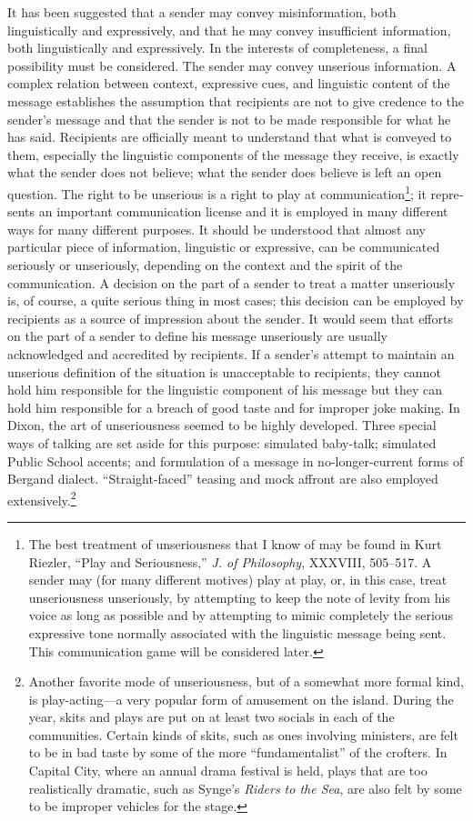 \documentclass[twoside,symmetric,nobib,justified]{tufte-book}
\begin{document}
It has been suggested that a sender may convey misin­formation, both
linguistically and expressively, and that he may convey insufficient
information, both linguistically and expres­sively. In the interests of
completeness, a final possibility must be considered. The sender may
convey unserious information. A complex relation between context,
expressive cues, and linguis­tic content of the message establishes the
assumption that recipi­ents are not to give credence to the sender's
message and that the sender is not to be made responsible for what he
has said. Recipients are officially meant to understand that what is
con­veyed to them, especially the linguistic components of the mes­sage
they receive, is exactly what the sender does not believe; what the
sender does believe is left an open question. The right to be unserious
is a right to play at communication\footnote{The best treatment of
  unseriousness that I know of may be found in Kurt Riezler, ``Play and
  Seriousness,'' \emph{J. of Philosophy}, XXXVIII, 505--517. A sender
  may (for many different motives) play at play, or, in this case, treat
  unseriousness unseriously, by attempting to keep the note of levity
  from his voice as long as possible and by attempting to mimic
  completely the serious expressive tone normally associated with the
  linguistic message being sent. This communication game will be
  considered later.}; it repre­sents an important communication license
and it is employed in many different ways for many different purposes.
It should be understood that almost any particular piece of information,
linguistic or expressive, can be communicated seriously or unseriously,
depending on the context and the spirit of the communica­tion. A decision
on the part of a sender to treat a matter unseriously is, of course, a
quite serious thing in most cases; this decision can be employed by
recipients as a source of impression about the sender. It would seem
that efforts on the part of a sender to define his message unseriously
are usually acknowledged and accredited by recipients. If a sender's
at­tempt to maintain an unserious definition of the situation is
unacceptable to recipients, they cannot hold him responsible for the
linguistic component of his message but they can hold him responsible
for a breach of good taste and for improper joke­ making. In Dixon, the
art of unseriousness seemed to be highly developed. Three special ways
of talking are set aside for this purpose: simulated baby-talk;
simulated Public School ac­cents; and formulation of a message in
no-longer-current forms of Bergand dialect. ``Straight-faced'' teasing
and mock affront are also employed extensively.\footnote{Another
  favorite mode of unseriousness, but of a some­what more formal kind, is
  play-acting---a very popular form of amusement on the island. During
  the year, skits and plays are put on at least two socials in each of
  the communities. Cer­tain kinds of skits, such as ones involving
  ministers, are felt to be in bad taste by some of the more
  ``fundamentalist'' of the crofters. In Capital City, where an annual
  drama festival is held, plays that are too realistically dramatic,
  such as Synge's \emph{Riders to the Sea}, are also felt by some to be
  improper vehicles for the stage.}
\end{document}
